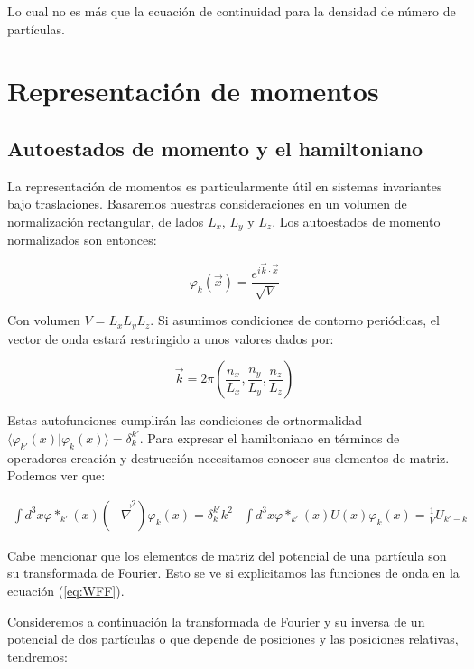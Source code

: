 \documentclass{article} %
\begin{document}
Lo cual no es más que la ecuación de continuidad para la densidad de número de partículas.

\section{Representación de momentos}

\subsection{Autoestados de momento y el hamiltoniano}

La representación de momentos es particularmente útil en sistemas invariantes bajo traslaciones. Basaremos nuestras consideraciones en un volumen de normalización rectangular, de lados $L_x$, $L_y$ y $L_z$. Los autoestados de momento normalizados son entonces:

\begin{equation}
\varphi_k (\vec{x}) = \frac{e^{i \vec{k} \cdot \vec{x}}}{\sqrt{V}}
\label{eq:WFF}
\end{equation}

Con volumen $V = L_x L_y L_z$. Si asumimos condiciones de contorno periódicas, el vector de onda estará restringido a unos valores dados por:

\begin{equation}
\vec{k} = 2\pi \left( \frac{n_x}{L_x}, \frac{n_y}{L_y}, \frac{n_z}{L_z} \right)
\end{equation}

Estas autofunciones cumplirán las condiciones de ortnormalidad $\langle \varphi_{k'} (x) | \varphi_k (x) \rangle = \delta_k^{k'}$. Para expresar el hamiltoniano en términos de operadores creación y destrucción necesitamos conocer sus elementos de matriz. Podemos ver que:

$$
\begin{array}{cc}
\int d^3x \varphi*_{k'} (x) (- \vec{\nabla}^2) \varphi_k (x) = \delta_k^{k'} k^2 & \int d^3x \varphi*_{k'} (x) U(x) \varphi_k (x) = \frac{1}{V} U_{k'-k}
\end{array}
$$

Cabe mencionar que los elementos de matriz del potencial de una partícula son su transformada de Fourier. Esto se ve si explicitamos las funciones de onda en la ecuación (\ref{eq:WFF}).

Consideremos a continuación la transformada de Fourier y su inversa de un potencial de dos partículas o que depende de posiciones y las posiciones relativas, tendremos:
\end{document}
